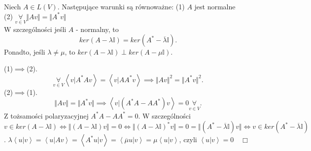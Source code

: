 \documentclass[../main.tex]{subfiles}
\begin{document}
\begin{stw}
Niech $A\in L(V)$. Następujące warunki są równoważne:
(1) $A$ jest normalne\\
(2) $\underset{v\in V}{\forall} \Vert Av \Vert = \Vert A^* v \Vert $\\
W szczególności jeśli $A$ - normalny, to
\[
    ker(A-\lambda \mathbb{I}) = ker(A^* - \overline{\lambda}\mathbb{I})
.\]
Ponadto, jeśli $\lambda \neq \mu$, to $ker(A-\lambda\mathbb{I} )\perp ker(A-\mu\mathbb{I})$.
\end{stw}
\begin{dowod}
    (1)$\implies$(2).\\
    \[
    \underset{v\in V}{\forall} \left<v|A^*Av \right> = \left<v|AA^*v \right> \implies \Vert Av \Vert^2 = \Vert A^*v \Vert^2
    .\]
    (2)$\implies$(1).\\
    \[
        \Vert Av \Vert = \Vert A^*v \Vert \implies \left<v|(A^*A - AA^*)v \right> = 0 \underset{v\in V}{\forall}
    .\]
    Z tożsamości polaryzacyjnej $A^*A - AA^* = 0$. W szczególności $v\in ker(A-\lambda\mathbb{I}) \iff \Vert (A-\lambda\mathbb{I})v \Vert = 0 \iff \Vert (A-\lambda\mathbb{I})^*v \Vert = 0 = \Vert (A^* - \overline{\lambda}\mathbb{I})v \Vert \iff v\in ker(A^* - \overline{\lambda}\mathbb{I})$. $\lambda\left<u|v \right> = \left<u|Av \right> = \left<A^*u|v \right> = \left<\overline{\mu}u|v \right> = \mu \left<u|v \right>$, czyli $\left<u|v \right> = 0\quad\Box$
\end{dowod}
\end{document}
